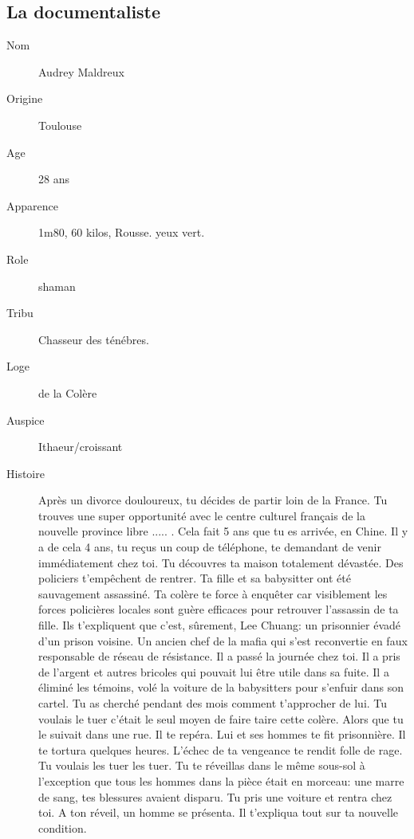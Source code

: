 \documentclass[oneside,12pt]{book}
\begin{document}
\begin{flushleft}
\subsection{La documentaliste}
\begin{description}
\item[Nom]{ Audrey Maldreux}
\item[Origine]{ Toulouse}
\item[Age]{ 28 ans}
\item[Apparence]{1m80, 60 kilos, Rousse. yeux vert.}
\item[Role]{shaman}
\item[Tribu]{Chasseur des ténébres.}
\item[Loge]{de la Colère}
\item[Auspice]{Ithaeur/croissant}
\item[Histoire]{Après un divorce douloureux, tu décides de partir loin de la France. Tu trouves une super opportunité avec le centre culturel français de la nouvelle province libre ..... . Cela fait 5 ans que tu es arrivée, en Chine. Il y a de cela 4 ans, tu reçus un coup de téléphone, te demandant de venir immédiatement chez toi. Tu découvres ta maison totalement dévastée. Des policiers t'empêchent de rentrer. Ta fille et sa babysitter ont été sauvagement assassiné. Ta colère te force à enquêter car visiblement les forces policières locales sont guère efficaces pour retrouver l'assassin de ta fille. Ils t'expliquent que c'est, sûrement, Lee Chuang: un prisonnier évadé d'un prison voisine. Un ancien chef de la mafia qui s'est reconvertie en faux responsable de réseau de résistance. Il a passé la journée chez toi. Il a pris de l'argent et autres bricoles qui pouvait lui être utile dans sa fuite. Il a éliminé les témoins, volé la voiture de la babysitters  pour s'enfuir dans son cartel. Tu as cherché pendant des mois comment t'approcher de lui.  Tu voulais le tuer c'était le seul moyen de faire taire cette colère.  Alors que tu le suivait dans une rue. Il te repéra. Lui et ses hommes te fit prisonnière. Il te tortura quelques heures. L'échec de ta vengeance te rendit folle de rage. Tu voulais les tuer les tuer.  Tu te réveillas dans le même sous-sol à l'exception que tous les hommes dans la pièce était en morceau: une marre de sang, tes blessures avaient disparu. Tu pris une voiture et rentra chez toi. A ton réveil, un homme se présenta. Il t'expliqua tout sur ta nouvelle condition.}
\end{description}
\clearpage


\end{flushleft}
\end{document}
